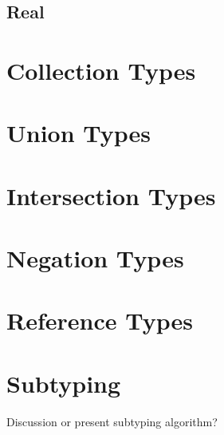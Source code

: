 \subsection{Real}
\section{Collection Types}
\section{Union Types}
\section{Intersection Types}
\section{Negation Types}
\section{Reference Types}
\section{Subtyping}
Discussion or present subtyping algorithm?
